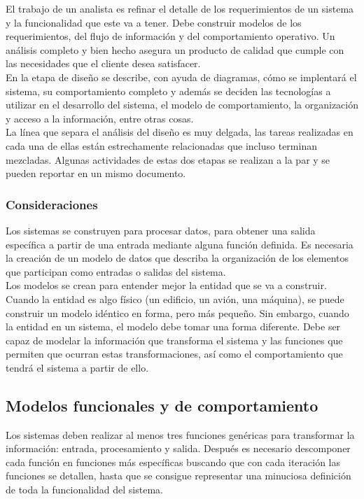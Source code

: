 El trabajo de un analista es refinar el detalle de los requerimientos de un sistema y la funcionalidad que este va a tener. Debe construir modelos de los requerimientos, del flujo de información y del comportamiento operativo. Un análisis completo
y bien hecho asegura un producto de calidad que cumple con las necesidades que el cliente desea satisfacer. \\

En la etapa de diseño se describe, con ayuda de diagramas, cómo se implentará el sistema, su comportamiento completo y además se deciden
las tecnologías a utilizar en el desarrollo del sistema, el modelo de comportamiento, la organización y acceso a la información, entre otras cosas.\\

La línea que separa el análisis del diseño es muy delgada, las tareas realizadas en cada una de ellas están estrechamente relacionadas que
incluso terminan mezcladas. Algunas actividades de estas dos etapas se realizan a la par y se pueden reportar en un mismo documento.\\

\subsubsection{Consideraciones}

Los sistemas se construyen para procesar datos, para obtener una salida específica a partir de una entrada mediante alguna función definida. 
Es necesaria la creación de un modelo de datos que describa la organización de los elementos que participan como entradas o salidas del sistema.\\

Los modelos se crean para entender mejor la entidad que se va a construir. Cuando la entidad es algo físico (un edificio, un avión, una máquina), 
se puede construir un modelo idéntico en forma, pero más pequeño. Sin embargo, cuando la entidad en un sistema,
el modelo debe tomar una forma diferente. Debe ser capaz de modelar la información que transforma el sistema y las funciones que 
permiten que ocurran estas transformaciones, así como el comportamiento que tendrá el sistema a partir de ello.\\

\subsection{Modelos funcionales y de comportamiento}
Los sistemas deben realizar al menos tres funciones genéricas para transformar la información: entrada, procesamiento y salida. 
Después es necesario descomponer cada función en funciones más específicas buscando que con cada iteración 
las funciones se detallen, hasta que se consigue representar una minuciosa definición de toda la funcionalidad del sistema.\\

